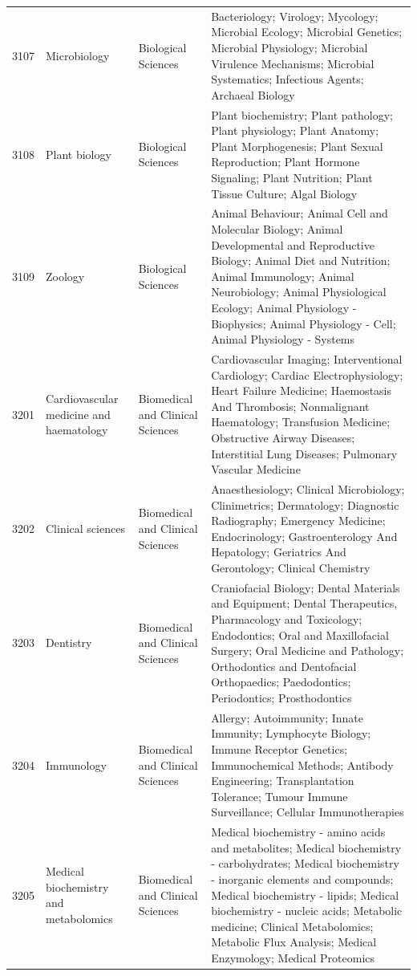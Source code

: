 \begin{longtable}{r p{2.45cm} p{2.55cm} p{6.15cm}}
3107 & Microbiology & Biological Sciences & Bacteriology; Virology; Mycology; Microbial Ecology; Microbial Genetics; Microbial Physiology; Microbial Virulence Mechanisms; Microbial Systematics; Infectious Agents; Archaeal Biology \\
3108 & Plant biology & Biological Sciences & Plant biochemistry; Plant pathology; Plant physiology; Plant Anatomy; Plant Morphogenesis; Plant Sexual Reproduction; Plant Hormone Signaling; Plant Nutrition; Plant Tissue Culture; Algal Biology \\
3109 & Zoology & Biological Sciences & Animal Behaviour; Animal Cell and Molecular Biology; Animal Developmental and Reproductive Biology; Animal Diet and Nutrition; Animal Immunology; Animal Neurobiology; Animal Physiological Ecology; Animal Physiology - Biophysics; Animal Physiology - Cell; Animal Physiology - Systems \\
3201 & Cardiovascular medicine and haematology & Biomedical and Clinical Sciences & Cardiovascular Imaging; Interventional Cardiology; Cardiac Electrophysiology; Heart Failure Medicine; Haemostasis And Thrombosis; Nonmalignant Haematology; Transfusion Medicine; Obstructive Airway Diseases; Interstitial Lung Diseases; Pulmonary Vascular Medicine \\
3202 & Clinical sciences & Biomedical and Clinical Sciences & Anaesthesiology; Clinical Microbiology; Clinimetrics; Dermatology; Diagnostic Radiography; Emergency Medicine; Endocrinology; Gastroenterology And Hepatology; Geriatrics And Gerontology; Clinical Chemistry \\
3203 & Dentistry & Biomedical and Clinical Sciences & Craniofacial Biology; Dental Materials and Equipment; Dental Therapeutics, Pharmacology and Toxicology; Endodontics; Oral and Maxillofacial Surgery; Oral Medicine and Pathology; Orthodontics and Dentofacial Orthopaedics; Paedodontics; Periodontics; Prosthodontics \\
3204 & Immunology & Biomedical and Clinical Sciences & Allergy; Autoimmunity; Innate Immunity; Lymphocyte Biology; Immune Receptor Genetics; Immunochemical Methods; Antibody Engineering; Transplantation Tolerance; Tumour Immune Surveillance; Cellular Immunotherapies \\
3205 & Medical biochemistry and metabolomics & Biomedical and Clinical Sciences & Medical biochemistry - amino acids and metabolites; Medical biochemistry - carbohydrates; Medical biochemistry - inorganic elements and compounds; Medical biochemistry - lipids; Medical biochemistry - nucleic acids; Metabolic medicine; Clinical Metabolomics; Metabolic Flux Analysis; Medical Enzymology; Medical Proteomics \\

\end{longtable}
